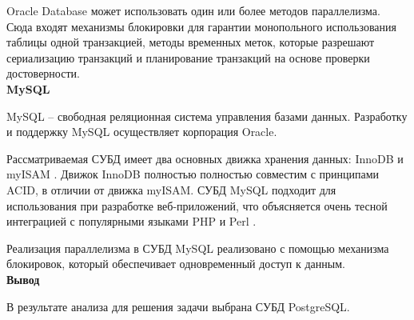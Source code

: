 Oracle Database может использовать один или более методов параллелизма. Сюда входят механизмы блокировки для гарантии монопольного использования таблицы одной транзакцией, методы временных меток, которые разрешают сериализацию транзакций и планирование транзакций на основе проверки достоверности. \\

\noindent\textbf{MySQL}

MySQL \cite{mysql} -- свободная реляционная система управления базами данных. Разработку и поддержку MySQL осуществляет корпорация Oracle.

Рассматриваемая СУБД имеет два основных движка хранения данных: InnoDB \cite{innodb} и myISAM \cite{myisam}. Движок InnoDB полностью полностью совместим с принципами ACID, в отличии от движка myISAM. СУБД MySQL подходит  для использования при разработке веб-приложений, что объясняется очень тесной интеграцией с популярными языками PHP \cite{php} и Perl \cite{perl}.

Реализация параллелизма в СУБД MySQL реализовано с помощью механизма блокировок, который обеспечивает одновременный доступ к данным. \\

\noindent\textbf{Вывод}

В результате анализа для решения задачи выбрана СУБД PostgreSQL.
